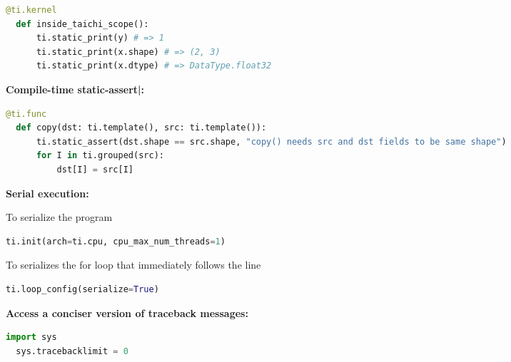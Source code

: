 \documentclass[10pt,landscape,a4paper]{article}
\newenvironment{myboxed}[1]
{\begin{mdframed}[linecolor=black,
                  backgroundcolor=white,
                  outerlinewidth=0.25pt,
                  innertopmargin=1ex,
                  topline=true,
                  rightline=true,
                  leftline=true,
                  bottomline=true,
                  linecolor=black!0,
                  frametitleaboveskip=0.5em,
                  frametitlebelowskip=0.5em,
                  innerbottommargin=.5\baselineskip,
                  innerrightmargin=.5em,
                  innerleftmargin=.5em,
                  frametitle={\footnotesize \RobotoSlab \bfseries \hspace*{0mm} #1},
                  frametitlebackgroundcolor=black!5,
                  frametitlerulewidth=2pt]}
{\end{mdframed}}
\begin{document}
\begin{multicols*}{5}
\begin{myboxed}{Debugging}
\begin{lstlisting}[language=Python]
  @ti.kernel
  def inside_taichi_scope():
      ti.static_print(y) # => 1
      ti.static_print(x.shape) # => (2, 3)
      ti.static_print(x.dtype) # => DataType.float32
  \end{lstlisting}
  
  \textbf{Compile-time static-assert|:}
  \begin{lstlisting}[language=Python]
  @ti.func
  def copy(dst: ti.template(), src: ti.template()):
      ti.static_assert(dst.shape == src.shape, "copy() needs src and dst fields to be same shape")
      for I in ti.grouped(src):
          dst[I] = src[I]
  \end{lstlisting}
  
  \textbf{Serial execution:}

  To serialize the program
  \begin{lstlisting}[language=Python]
  ti.init(arch=ti.cpu, cpu_max_num_threads=1)
  \end{lstlisting}
  To serializes the for loop that immediately follows the line
  \begin{lstlisting}[language=Python]
  ti.loop_config(serialize=True)
  \end{lstlisting}

  \textbf{Access a conciser version of traceback messages:}
  \begin{lstlisting}[language=Python]
  import sys
  sys.tracebacklimit = 0
  \end{lstlisting}
  \end{myboxed}
  \vspace{\fill}
\end{multicols*}
\end{document}
